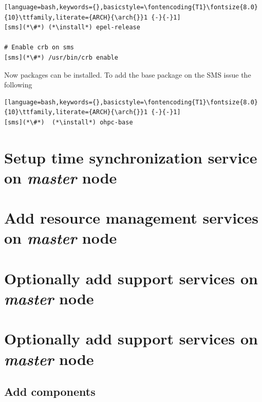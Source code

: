 \documentclass{ohpc-doc}
\newcommand{\arch}{x86\_64}
\newcommand{\install}{dnf -y install}
\begin{document}


\begin{lstlisting}[language=bash,keywords={},basicstyle=\fontencoding{T1}\fontsize{8.0}{10}\ttfamily,literate={ARCH}{\arch{}}1 {-}{-}1]
[sms](*\#*) (*\install*) epel-release

# Enable crb on sms
[sms](*\#*) /usr/bin/crb enable
\end{lstlisting}

Now \OHPC{} packages can be installed. To add the base package on the SMS
issue the following
\begin{lstlisting}[language=bash,keywords={},basicstyle=\fontencoding{T1}\fontsize{8.0}{10}\ttfamily,literate={ARCH}{\arch{}}1 {-}{-}1]
[sms](*\#*)  (*\install*) ohpc-base
\end{lstlisting}



\section{Setup time synchronization service on {\em master} node} \label{sec:add_ntp}


%

\section{Add resource management services on {\em master} node} \label{sec:add_rm}


\section{Optionally add \InfiniBand{} support services on {\em master} node} \label{sec:add_ofed}


\section{Optionally add \OmniPath{} support services on {\em master} node} \label{sec:add_opa}


\subsection{Add \OHPC{} components} \label{sec:add_components}

\end{document}
